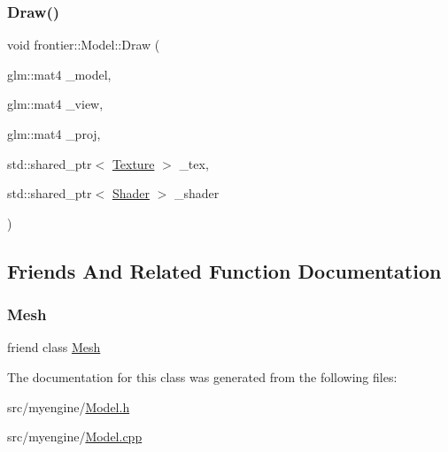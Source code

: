 \subsubsection{\texorpdfstring{Draw()}{Draw()}}
{\footnotesize\ttfamily void frontier\+::\+Model\+::\+Draw (\begin{DoxyParamCaption}\item[{glm\+::mat4}]{\+\_\+model,  }\item[{glm\+::mat4}]{\+\_\+view,  }\item[{glm\+::mat4}]{\+\_\+proj,  }\item[{std\+::shared\+\_\+ptr$<$ \hyperlink{classfrontier_1_1_texture}{Texture} $>$}]{\+\_\+tex,  }\item[{std\+::shared\+\_\+ptr$<$ \hyperlink{classfrontier_1_1_shader}{Shader} $>$}]{\+\_\+shader }\end{DoxyParamCaption})}



\subsection{Friends And Related Function Documentation}
\mbox{\label{classfrontier_1_1_model_aa41a130f156b145bffb3f4b5172c4c93}} 
\subsubsection{\texorpdfstring{Mesh}{Mesh}}
{\footnotesize\ttfamily friend class \hyperlink{classfrontier_1_1_mesh}{Mesh}\hspace{0.3cm}{\ttfamily [friend]}}



The documentation for this class was generated from the following files\+:\begin{DoxyCompactItemize}
\item 
src/myengine/\hyperlink{_model_8h}{Model.\+h}\item 
src/myengine/\hyperlink{_model_8cpp}{Model.\+cpp}\end{DoxyCompactItemize}
